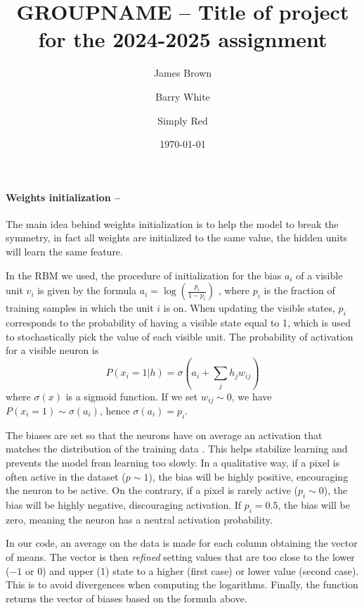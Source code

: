 \documentclass[prl,twocolumn]{revtex4-1}
\begin{document}
\title{GROUPNAME -- Title of project for the 2024-2025 assignment}





\author{James Brown}
\author{Barry White}
\author{Simply Red}

\date{\today}



\maketitle


\paragraph{\bf Weights initialization --}
The main idea behind weights initialization is to help the model to break the symmetry, in fact all weights are initialized to the same value, the hidden units will learn the same feature.

In the RBM we used, the procedure of initialization for the bias $a_i$ of a visible unit $v_i$ is given by the formula $ a_i = \log(\frac{p_i}{1-p_i})$ \cite{HintonPractical}, where $p_i$ is the fraction of training samples in which the unit $i$ is on. 
When updating the visible states, $p_i$ corresponds to the probability of having a visible state equal to 1, which is used to stochastically pick the value of each visible unit. The probability of activation for a visible neuron is 
\begin{equation}
P(x_i=1|h)= \sigma(a_i + \sum_j h_j w_{ij})
\end{equation}
where $\sigma(x)$ is a sigmoid function. If we set $w_{ij}\sim 0$, we have $P(x_i=1) \sim \sigma(a_i)$, hence $\sigma(a_i) = p_i$.

The biases are set so that the neurons have on average an activation that matches the distribution of the training data \cite{mehta}. This helps stabilize learning and prevents the model from learning too slowly.
In a qualitative way, if a pixel is often active in the dataset ($p\sim 1$), the bias will be highly positive, encouraging the neuron to be active. On the contrary, if a pixel is rarely active ($p_i \sim 0$), the bias will be highly negative, discouraging activation. If $p_i = 0.5$, the bias will be zero, meaning the neuron has a neutral activation probability.

In our code, an average on the data is made for each column obtaining the vector of means.
The vector is then \emph{refined} setting values that are too close to the lower ($-1$ or $0$) and upper (1) state to a higher (first case) or lower value (second case). This is to avoid divergences when computing the logarithms. Finally, the function returns the vector of biases based on the formula above.
\end{document}
